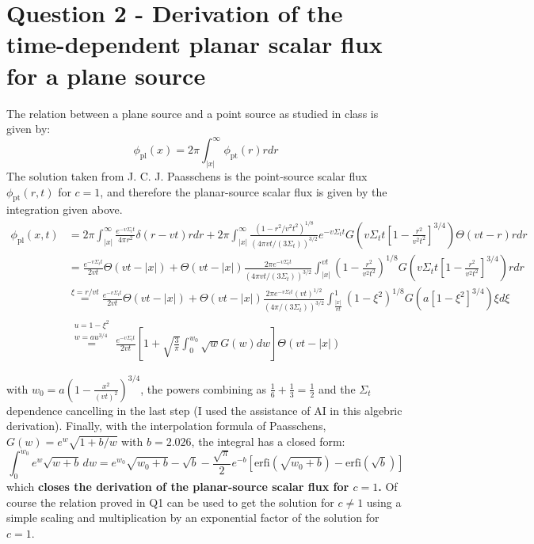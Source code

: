 \documentclass[11pt]{article}
\begin{document}
\section*{Question 2 - Derivation of the time-dependent planar scalar flux for a plane source}
The relation between a plane source and a point source as studied in class is given by:
\begin{equation}
    \phi_{\text{pl}}(x) = 2\pi\int_{|x|}^{\infty} \phi_{\text{pt}}(r)rdr
\end{equation}
The solution taken from J. C. J. Paasschens is the point-source scalar flux $\phi_{\text{pt}}(r,t)$ for $c=1$, and therefore the planar-source scalar flux is given by the integration given above.
\begin{align}
    \phi_{\text{pl}}(x,t) &= 2\pi \int_{|x|}^{\infty} \frac{e^{-v\Sigma_t t}}{{4\pi r^2}}\delta(r-vt)rdr + {2\pi}\int_{|x|}^{\infty} \frac{{\left(1-r^2/v^2t^2\right)}^{1/8}}{\left(4\pi vt/(3\Sigma_t)\right)^{3/2}} e^{-v\Sigma_t t}G\left(v\Sigma_t t\left[1-\frac{r^2}{v^2t^2}\right]^{3/4}\right)\Theta(vt-r)rdr \\
    &= \frac{e^{-v\Sigma_t t}}{2vt}\Theta(vt-|x|) + \Theta(vt-|x|) \frac{2\pi e^{-v\Sigma_t t}}{\left(4\pi vt/(3\Sigma_t)\right)^{3/2}} \int_{|x|}^{vt} \left(1-\frac{r^2}{v^2t^2}\right)^{1/8} G\left(v\Sigma_t t\left[1-\frac{r^2}{v^2t^2}\right]^{3/4}\right)rdr \\
    &\overset{{\xi = r/vt}}{=} \frac{e^{-v\Sigma_t t}}{2vt}\Theta(vt-|x|) + \Theta(vt-|x|) \frac{2\pi e^{-v\Sigma_t t}(vt)^{1/2}}{\left(4\pi /(3\Sigma_t)\right)^{3/2}} \int_{\frac{|x|}{vt}}^{1} \left(1-\xi^2\right)^{1/8} G\left(a\left[1-\xi^2\right]^{3/4}\right) \xi d\xi \\
    &\overset{\substack{u=1-\xi^2\\ w=au^{3/4}}}{=} \frac{e^{-v\Sigma_t t}}{2vt}\left[1 + \sqrt{\frac{3}{\pi}}\int_{0}^{w_0}\sqrt{w}G(w)dw\right]\Theta(vt-|x|)
\end{align}


with $w_0 = a\left(1-\frac{x^2}{(vt)^2}\right)^{3/4}$, the powers combining as $\frac{1}{6}+\frac{1}{3}=\frac{1}{2}$ and the $\Sigma_t$ dependence cancelling in the last step (I used the assistance of AI in this algebric derivation). Finally, with the interpolation formula of Paasschens, $G(w) = e^{w}\sqrt{1+b/w}$ with $b=2.026$, the integral has a closed form:
\begin{equation}
    \int_{0}^{w_0}e^{w}\sqrt{w+b}\,dw = e^{w_0}\sqrt{w_0+b} - \sqrt{b} - \frac{\sqrt{\pi}}{2}e^{-b}\left[\text{erfi}\left(\sqrt{w_0+b}\right)-\text{erfi}\left(\sqrt{b}\right)\right]
\end{equation}
which \textbf{closes the derivation of the planar-source scalar flux for $c=1$.}
Of course the relation proved in Q1 can be used to get the solution for $c\neq 1$ using a simple scaling and multiplication by an exponential factor of the solution for $c=1$.
\end{document}
